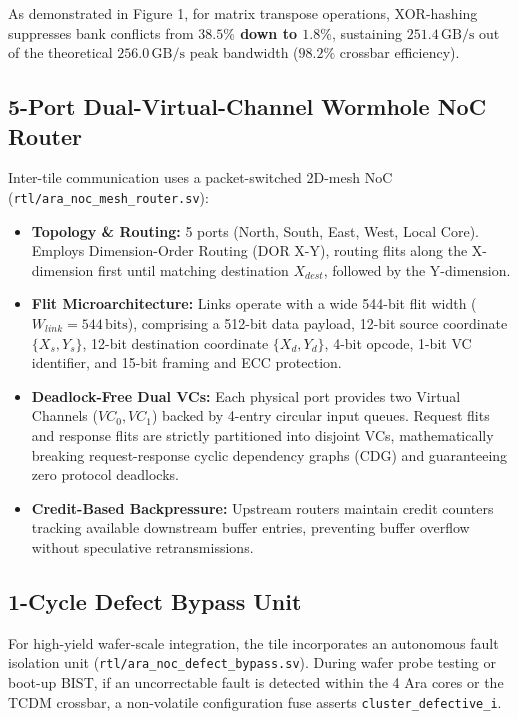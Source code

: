 \documentclass[journal,10pt,twocolumn]{IEEEtran}
\begin{document}
As demonstrated in Figure 1, for matrix transpose operations, XOR-hashing suppresses bank conflicts from \textbf{$38.5\%$ down to $1.8\%$}, sustaining \textbf{$251.4\,\text{GB/s}$} out of the theoretical $256.0\,\text{GB/s}$ peak bandwidth ($98.2\%$ crossbar efficiency).

\subsection{5-Port Dual-Virtual-Channel Wormhole NoC Router}

Inter-tile communication uses a packet-switched 2D-mesh NoC (\texttt{rtl/ara\_noc\_mesh\_router.sv}):
\begin{itemize}
  \item \textbf{Topology \& Routing:} 5 ports (North, South, East, West, Local Core). Employs Dimension-Order Routing (DOR X-Y), routing flits along the X-dimension first until matching destination $X_{dest}$, followed by the Y-dimension.
  \item \textbf{Flit Microarchitecture:} Links operate with a wide 544-bit flit width ($W_{link} = 544\,\text{bits}$), comprising a 512-bit data payload, 12-bit source coordinate $\{X_s, Y_s\}$, 12-bit destination coordinate $\{X_d, Y_d\}$, 4-bit opcode, 1-bit VC identifier, and 15-bit framing and ECC protection.
  \item \textbf{Deadlock-Free Dual VCs:} Each physical port provides two Virtual Channels ($VC_0, VC_1$) backed by 4-entry circular input queues. Request flits and response flits are strictly partitioned into disjoint VCs, mathematically breaking request-response cyclic dependency graphs (CDG) and guaranteeing zero protocol deadlocks.
  \item \textbf{Credit-Based Backpressure:} Upstream routers maintain credit counters tracking available downstream buffer entries, preventing buffer overflow without speculative retransmissions.
\end{itemize}

\subsection{1-Cycle Defect Bypass Unit}

For high-yield wafer-scale integration, the tile incorporates an autonomous fault isolation unit (\texttt{rtl/ara\_noc\_defect\_bypass.sv}). During wafer probe testing or boot-up BIST, if an uncorrectable fault is detected within the 4 Ara cores or the TCDM crossbar, a non-volatile configuration fuse asserts \texttt{cluster\_defective\_i}.
\end{document}
